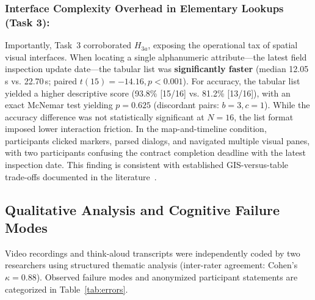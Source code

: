 \documentclass[runningheads]{llncs}
\begin{document}
\subsubsection{Interface Complexity Overhead in Elementary Lookups (Task 3):}
Importantly, Task~3 corroborated $H_{3a}$, exposing the operational tax of spatial visual interfaces. When locating a single alphanumeric attribute---the latest field inspection update date---the tabular list was \textbf{significantly faster} (median 12.05\,s vs. 22.70\,s; paired $t(15) = -14.16, p < 0.001$). For accuracy, the tabular list yielded a higher descriptive score (93.8\% [15/16] vs. 81.2\% [13/16]), with an exact McNemar test yielding $p = 0.625$ (discordant pairs: $b = 3, c = 1$). While the accuracy difference was not statistically significant at $N = 16$, the list format imposed lower interaction friction. In the map-and-timeline condition, participants clicked markers, parsed dialogs, and navigated multiple visual panes, with two participants confusing the contract completion deadline with the latest inspection date. This finding is consistent with established GIS-versus-table trade-offs documented in the literature~\cite{kytta2023prioritizing,lehto2022landscape}.

\subsection{Qualitative Analysis and Cognitive Failure Modes}
Video recordings and think-aloud transcripts were independently coded by two researchers using structured thematic analysis (inter-rater agreement: Cohen's $\kappa = 0.88$). Observed failure modes and anonymized participant statements are categorized in Table~\ref{tab:errors}.
\end{document}
